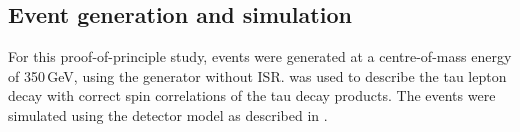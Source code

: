 






\subsection{Event generation and simulation}

For this proof-of-principle study, \eeZZQQ events were generated at a centre-of-mass energy of 350\,GeV, using the \WHIZARD generator without ISR. \TAUOLA was used to describe the tau lepton decay with correct spin correlations of the tau decay products. The \eeZZQQ events were simulated using the \ILD detector model as described in .




